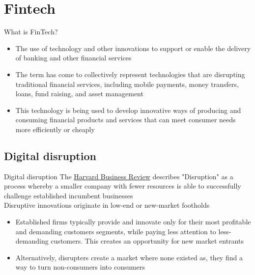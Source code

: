 \documentclass[10pt]{beamer}
\begin{document}
\section{Fintech}

\begin{frame}{What is FinTech?}
	\begin{itemize}
		\item The use of technology and other innovations to support or enable the delivery of banking and other financial services
		\item The term has come to collectively represent technologies that are disrupting traditional financial services, including mobile payments, money transfers, loans, fund raising, and asset management
		\item This technology is being used to develop innovative ways of producing and consuming financial products and services that can meet consumer needs more efficiently or cheaply
	\end{itemize}
\end{frame}

\subsection{Digital disruption}

\begin{frame}{Digital disruption}
	The \href{https://hbr.org/2015/12/what-is-disruptive-innovation}{Harvard Business Review} describes "Disruption" as a process whereby a smaller company with fewer resources is able to successfully challenge established incumbent businesses \\ \vspace{3mm}
	Disruptive innovations originate in low-end or new-market footholds
	\begin{itemize}
		\item Established firms typically provide and innovate only for their most profitable and demanding customers segments, while paying less attention to less-demanding customers. This creates an opportunity for new market entrants
		\item Alternatively, disrupters create a market where none existed as, they find a way to turn non-consumers into consumers
	\end{itemize}
\end{frame}

\end{document}

